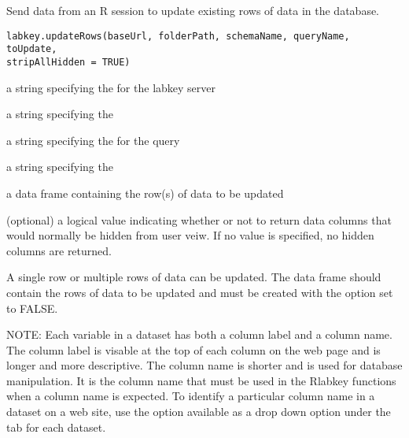 \documentclass{article}
\begin{document}
\begin{Description}\relax
Send data from an R session to update existing rows of data in the database.
\end{Description}
\begin{Usage}
\begin{verbatim}
labkey.updateRows(baseUrl, folderPath, schemaName, queryName, toUpdate, 
stripAllHidden = TRUE)
\end{verbatim}
\end{Usage}
\begin{Arguments}
\begin{ldescription}
\item[\code{baseUrl}] a string specifying the for the labkey server
\item[\code{folderPath}] a string specifying the  
\item[\code{schemaName}] a string specifying the  for the query
\item[\code{queryName}] a string specifying the  
\item[\code{toUpdate}] a data frame containing the row(s) of data to be updated
\item[\code{stripAllHidden}] (optional) a logical value indicating whether or not to return data columns that would 
normally be hidden from user veiw. If no value is specified, no hidden columns are returned.
\end{ldescription}
\end{Arguments}
\begin{Details}\relax
A single row or multiple rows of data can be updated.  The  data frame should contain 
the rows of data to be updated and must be created with the  option
set to FALSE. 

NOTE: Each variable in a dataset has both a column label and a column name. The column label is visable at the top
of each column on the web page and is longer and more descriptive. The column name is shorter and is
used  for database manipulation. It is the column name that must be used in
the Rlabkey functions when a column name is expected. To identify a particular column name in a dataset on
a web site, use the  option available as a drop down option under the 
tab for each dataset.
\end{Details}
\end{document}
